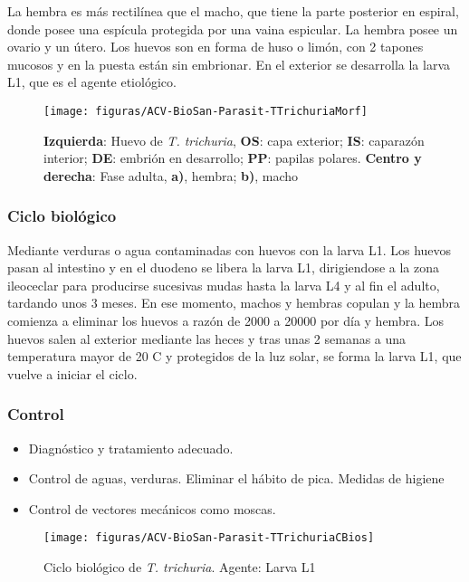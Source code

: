 La hembra es más rectilínea que el macho, que tiene la parte posterior en espiral, donde posee una espícula protegida por una vaina espicular. La hembra posee un ovario y un útero. Los huevos son en forma de huso o limón, con 2 tapones mucosos y en la puesta están sin embrionar. En el exterior se desarrolla la larva L1, que es el agente etiológico.
\begin{figure}[H]
	\centering
	\texttt{[image: figuras/ACV-BioSan-Parasit-TTrichuriaMorf]}
	\caption[Morfología de \textit{T. trichuria}]{\textbf{Izquierda}: Huevo de \textit{T. trichuria}, \textbf{OS}: capa exterior; \textbf{IS}: caparazón interior; \textbf{DE}: embrión en desarrollo; \textbf{PP}: papilas polares. \textbf{Centro y derecha}: Fase adulta, \textbf{a)}, hembra; \textbf{b)}, macho \label{fig:PARASIT:TTrichuriaMorf}}
\end{figure}
\begin{multicols}{2}
	\subsubsection{Ciclo biológico}
	Mediante verduras o agua contaminadas con huevos con la larva L1. Los huevos pasan al intestino y en el duodeno se libera la larva L1, dirigiendose a la zona ileoceclar para producirse sucesivas mudas hasta la larva L4 y al fin el adulto, tardando unos 3 meses. En ese momento, machos y hembras copulan y la hembra comienza a eliminar los huevos a razón de 2000 a 20000 por día y hembra. Los huevos salen al exterior mediante las heces y tras unas 2 semanas a una temperatura mayor de 20 C y protegidos de la luz solar, se forma la larva L1, que vuelve a iniciar el ciclo.
	\subsubsection{Control}
	\begin{itemize}[itemsep=0pt,parsep=0pt,topsep=0pt,partopsep=0pt]
		\item Diagnóstico y tratamiento adecuado.
		\item Control de aguas, verduras. Eliminar el hábito de pica. Medidas de higiene
		\item Control de vectores mecánicos como moscas.
	\end{itemize}
	\columnbreak
	\begin{figure}[H]
		\centering
		\texttt{[image: figuras/ACV-BioSan-Parasit-TTrichuriaCBios]}
		\caption[Ciclo biológico de \textit{T. trichuria}]{Ciclo biológico de \textit{T. trichuria}. Agente: Larva L1 \label{fig:PARASIT:TTrichuriaCBios}}
	\end{figure}
\end{multicols}
